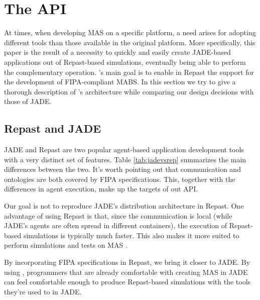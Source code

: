 \section{The \apiname{} API} %
\label{sec:proposal}

At times, when developing MAS on a specific platform, a need arises for adopting different tools than those available in the original platform. More specifically, this paper is the result of a necessity to quickly and easily create JADE-based applications out of Repast-based simulations, eventually being able to perform the complementary operation. \apiname{}'s main goal is to enable in Repast the support for the development of FIPA-compliant MABS. In this section we try to give a thorough description of \apiname{}'s architecture while comparing our design decisions with those of JADE.

\subsection{Repast and JADE}
JADE and Repast are two popular agent-based application development tools with a very distinct set of features. Table \ref{tab:jadevsrep} summarizes the main differences between the two. It's worth pointing out that communication and ontologies are both covered by FIPA specifications. This, together with the differences in agent execution, make up the targets of out API.

Our goal is not to reproduce JADE's distribution architecture in Repast. One advantage of using Repast is that, since the communication is local (while JADE's agents are often spread in different containers), the execution of Repast-based simulations is typically much faster. This also makes it more suited to perform simulations and tests on MAS \cite{mengistu2008scalability} \cite{gormer2011jrep} \cite{garcia2011misia}.

By incorporating FIPA specifications in Repast, we bring it closer to JADE. By using \apiname{}, programmers that are already comfortable with creating MAS in JADE can feel comfortable enough to produce Repast-based simulations with the tools they're used to in JADE.


